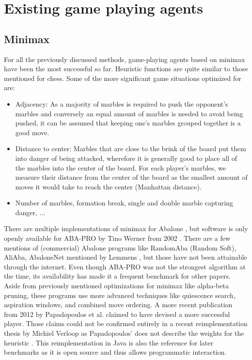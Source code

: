 \section{Existing game playing agents}
\label{existing_game_playing_agents}
\subsection{Minimax}
For all the previously discussed methods, game-playing agents based on minimax have been the most successful so far. Heuristic functions are quite similar to those mentioned for chess. Some of the more significant game situations optimized for are:

\begin{itemize}
    \item Adjacency: As a majority of marbles is required to push the opponent's marbles and conversely an equal amount of marbles is needed to avoid being pushed, it can be assumed that keeping one's marbles grouped together is a good move.
    \item Distance to center: Marbles that are close to the brink of the board put them into danger of being attacked, wherefore it is generally good to place all of the marbles into the center of the board. For each player's marbles, we measure their distance from the center of the board as the smallest amount of moves it would take to reach the center (Manhattan distance).
    \item Number of marbles, formation break, single and double marble capturing danger, ... \cite[p. 64]{papadopoulos_exploring_2012}
\end{itemize}

There are multiple implementations of minimax for Abalone \cite{chorus_implementing_2009,lemmens_constructing_2005,ozcan_simple_2004-1,aichholzer_algorithmic_2002}, but software is only openly available for ABA-PRO by Tino Werner from 2002 \cite{aichholzer_oswin_2006}. There are a few mentions of (commercial) Abalone programs like RandomAba (Random Soft), AliAba, AbaloneNet mentioned by Lemmens \cite[p. 7]{lemmens_constructing_2005}, but those have not been attainable through the internet. Even though ABA-PRO was not the strongest algorithm at the time, its availability has made it a frequent benchmark for other papers. Aside from previously mentioned optimizations for minimax like alpha-beta pruning, these programs use more advanced techniques like quiescence search, aspiration windows, and combined move ordering. A more recent publication from 2012 by Papadopoulos et al. claimed to have devised a more successful player. \cite{papadopoulos_exploring_2012}  Those claims could not be confirmed entirely in a recent reimplementation thesis by Michiel Verloop as Papadopoulos' does not describe the weights for the heuristic \cite{verloop_critical_nodate}. This reimplementation in Java \cite{verloop_abaloneai_nodate} is also the reference for later benchmarks as it is open source \cite{verloop_abaloneai_nodate} and thus allows programmatic interaction.

